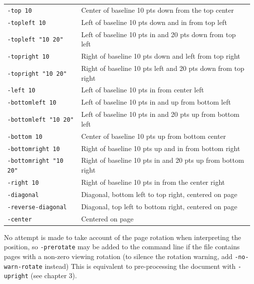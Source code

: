 \documentclass{book}
\begin{document}
  \begin{framed}
    \noindent\begin{tabular}{ll}
      \small\verb!-top 10! & Center of baseline 10 pts down from the top center \\
      \small\verb!-topleft 10! & Left of baseline 10 pts down and in from top left \\
      \small\verb!-topleft "10 20"! & Left of baseline 10 pts in and 20 pts down from top left \\
      \small\verb!-topright 10! & Right of baseline 10 pts down and left from top right\\
      \small\verb!-topright "10 20"! & Right of baseline 10 pts left and 20 pts down from top right\\
      \small\verb!-left 10! & Left of baseline 10 pts in from center left \\
      \small\verb!-bottomleft 10! & Left of baseline 10 pts in and up from bottom left \\
      \small\verb!-bottomleft "10 20"! & Left of baseline 10 pts in and 20 pts up from bottom left \\
      \small\verb!-bottom 10! & Center of baseline 10 pts up from bottom center\\
      \small\verb!-bottomright 10! & Right of baseline 10 pts up and in from bottom right \\
      \small\verb!-bottomright "10 20"! & Right of baseline 10 pts in and 20 pts up from bottom right \\
      \small\verb!-right 10! & Right of baseline 10 pts in from the center right \\
      \small\verb!-diagonal! & Diagonal, bottom left to top right, centered on page\\
      \small\verb!-reverse-diagonal! & Diagonal, top left to bottom right, centered on page\\    
      \small\verb!-center! & Centered on page\\
    \end{tabular}
  \end{framed}

\noindent No attempt is made to take account of the page rotation when interpreting the
position, so \texttt{-prerotate} may be added to the command line if the file
contains pages with a non-zero viewing rotation (to silence the rotation warning, add \texttt{-no-warn-rotate} instead) This is equivalent to
pre-processing the document with \texttt{-upright} (see chapter 3).
   
\end{document}
